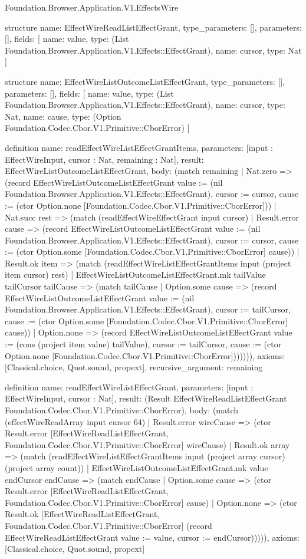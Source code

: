 \begin{lexlean}{Foundation.Browser.Application.V1.EffectsWire}
\begin{semanticmodule}
structure{
  name: EffectWireReadListEffectGrant,
  type_parameters: [],
  parameters: [],
  fields: [
    {name: value, type: (List Foundation.Browser.Application.V1.Effects::EffectGrant)},
    {name: cursor, type: Nat}
  ]
}

structure{
  name: EffectWireListOutcomeListEffectGrant,
  type_parameters: [],
  parameters: [],
  fields: [
    {name: value, type: (List Foundation.Browser.Application.V1.Effects::EffectGrant)},
    {name: cursor, type: Nat},
    {name: cause, type: (Option Foundation.Codec.Cbor.V1.Primitive::CborError)}
  ]
}

definition{
  name: readEffectWireListEffectGrantItems,
  parameters: [input : EffectWireInput, cursor : Nat, remaining : Nat],
  result: EffectWireListOutcomeListEffectGrant,
  body: (match remaining
    | Nat.zero => (record EffectWireListOutcomeListEffectGrant {value := (nil Foundation.Browser.Application.V1.Effects::EffectGrant), cursor := cursor, cause := (ctor Option.none [Foundation.Codec.Cbor.V1.Primitive::CborError])})
    | Nat.succ rest => (match (readEffectWireEffectGrant input cursor)
      | Result.error cause => (record EffectWireListOutcomeListEffectGrant {value := (nil Foundation.Browser.Application.V1.Effects::EffectGrant), cursor := cursor, cause := (ctor Option.some [Foundation.Codec.Cbor.V1.Primitive::CborError] cause)})
      | Result.ok item => (match (readEffectWireListEffectGrantItems input (project item cursor) rest)
        | EffectWireListOutcomeListEffectGrant.mk tailValue tailCursor tailCause => (match tailCause
          | Option.some cause => (record EffectWireListOutcomeListEffectGrant {value := (nil Foundation.Browser.Application.V1.Effects::EffectGrant), cursor := tailCursor, cause := (ctor Option.some [Foundation.Codec.Cbor.V1.Primitive::CborError] cause)})
          | Option.none => (record EffectWireListOutcomeListEffectGrant {value := (cons (project item value) tailValue), cursor := tailCursor, cause := (ctor Option.none [Foundation.Codec.Cbor.V1.Primitive::CborError])}))))),
  axioms: [Classical.choice, Quot.sound, propext],
  recursive_argument: remaining
}

definition{
  name: readEffectWireListEffectGrant,
  parameters: [input : EffectWireInput, cursor : Nat],
  result: (Result EffectWireReadListEffectGrant Foundation.Codec.Cbor.V1.Primitive::CborError),
  body: (match (effectWireReadArray input cursor 64)
    | Result.error wireCause => (ctor Result.error [EffectWireReadListEffectGrant, Foundation.Codec.Cbor.V1.Primitive::CborError] wireCause)
    | Result.ok array => (match (readEffectWireListEffectGrantItems input (project array cursor) (project array count))
      | EffectWireListOutcomeListEffectGrant.mk value endCursor endCause => (match endCause
        | Option.some cause => (ctor Result.error [EffectWireReadListEffectGrant, Foundation.Codec.Cbor.V1.Primitive::CborError] cause)
        | Option.none => (ctor Result.ok [EffectWireReadListEffectGrant, Foundation.Codec.Cbor.V1.Primitive::CborError] (record EffectWireReadListEffectGrant {value := value, cursor := endCursor}))))),
  axioms: [Classical.choice, Quot.sound, propext]
}


\end{semanticmodule}
\end{lexlean}
